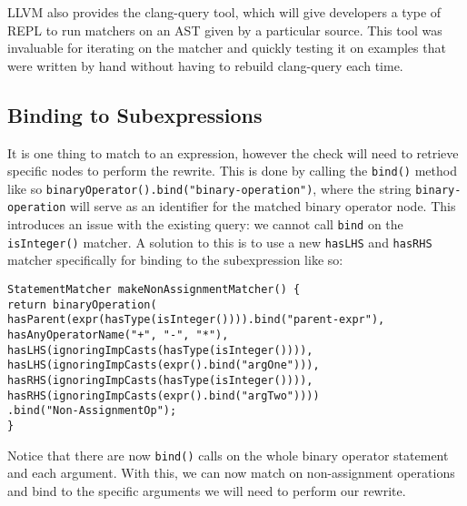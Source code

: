 LLVM also provides the clang-query tool, which will give developers a type of REPL to run matchers on an AST given by a particular source. This tool was invaluable for iterating on the matcher and quickly testing it on examples that were written by hand without having to rebuild clang-query each time.

\subsection{Binding to Subexpressions}

It is one thing to match to an expression, however the check will need to retrieve specific nodes to perform the rewrite. This is done by calling the \texttt{bind()} method like so \texttt{binaryOperator().bind("binary-operation")}, where the string \texttt{binary-operation} will serve as an identifier for the matched binary operator node. This introduces an issue with the existing query: we cannot call \texttt{bind} on the \texttt{isInteger()} matcher. A solution to this is to use a new \texttt{hasLHS} and \texttt{hasRHS} matcher specifically for binding to the subexpression like so:
\begin{center}
\parbox{0.9\linewidth}{
\texttt{StatementMatcher makeNonAssignmentMatcher() \{\\
\hspace*{2em}return binaryOperation(\\
\hspace*{2em}hasParent(expr(hasType(isInteger()))).bind("parent-expr"),\\
\hspace*{4em}hasAnyOperatorName("+", "-", "*"),\\
\hspace*{4em}hasLHS(ignoringImpCasts(hasType(isInteger()))),\\
\hspace*{4em}hasLHS(ignoringImpCasts(expr().bind("argOne"))),\\
\hspace*{4em}hasRHS(ignoringImpCasts(hasType(isInteger()))),\\
\hspace*{4em}hasRHS(ignoringImpCasts(expr().bind("argTwo"))))\\
\hspace*{2em}.bind("Non-AssignmentOp");\\
\}
}
}
\end{center}

Notice that there are now \texttt{bind()} calls on the whole binary operator statement and each argument. With this, we can now match on non-assignment operations and bind to the specific arguments we will need to perform our rewrite.

